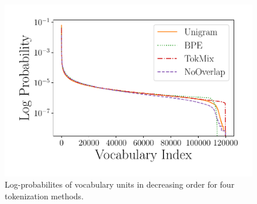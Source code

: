 \begin{figure}[tb!]
    \centering
    \includegraphics[width=1.0\linewidth]{figures/tokenizers_log_pdf_.pdf}
    
    \caption{Log-probabilites of vocabulary units in decreasing order for four tokenization methods.}
    \label{fig:tokenizers_log_pdf}
\end{figure}